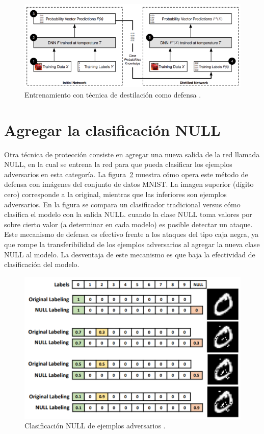 \begin{figure}[th]
\centering
\includegraphics[scale = 0.9]{Figures/figura_33.PNG}
\decoRule
\caption[Entrenamiento con técnica de destilación ) como defensas]{Entrenamiento con técnica de destilación como defensa \parencite{r24}.}
\label{fig:33}
\end{figure}

\section{Agregar la clasificación NULL}

Otra técnica de protección consiste en agregar una nueva salida de la red llamada NULL, en la cual se entrena la red para que pueda clasificar los ejemplos adversarios en esta categoría. La figura~\ref{fig:34} muestra cómo opera este método de defensa con imágenes del conjunto de datos MNIST. La imagen superior (dígito cero) corresponde a la original, mientras que las inferiores son ejemplos adversarios. En la figura se compara un clasificador tradicional versus cómo clasifica el modelo con la salida NULL. cuando la clase NULL toma valores por sobre cierto valor (a determinar en cada modelo) es posible detectar un ataque. Este mecanismo de defensa es efectivo frente a los ataques del tipo caja negra, ya que rompe la transferibilidad de los ejemplos adversarios \parencite{r7} al agregar la nueva clase NULL al modelo. La desventaja de este mecanismo es que baja la efectividad de clasificación del modelo.


\begin{figure}[th]
\centering
\includegraphics{Figures/figura_34.PNG}
\decoRule
\caption[Clasificación NULL de ejemplos adversarios]{Clasificación NULL de ejemplos adversarios \parencite{r7}.}
\label{fig:34}
\end{figure}

